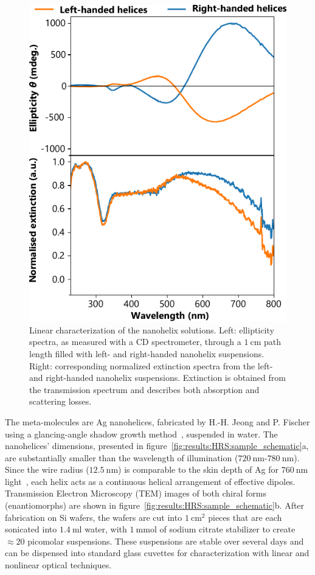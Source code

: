 \begin{figure}[htb!]	
    \centering	
    \includegraphics[scale=1]{./figures/results/HRS/linear_data.pdf}
    \caption{\label{fig:results:HRS:linear_data}
    Linear characterization of the nanohelix solutions. Left: ellipticity spectra, as measured with a CD spectrometer, through a $\SI{1}{\centi\m}$ path length filled with left- and right-handed nanohelix suspensions. Right: corresponding normalized extinction spectra from the left- and right-handed nanohelix suspensions. Extinction is obtained from the transmission spectrum and describes both absorption and scattering losses.}	
\end{figure}

The meta-molecules are Ag nanohelices, fabricated by H.-H. Jeong and P. Fischer using a glancing-angle shadow growth method~\cite{Gibbs2014}, suspended in water. The nanohelices' dimensions, presented in figure~\ref{fig:results:HRS:sample_schematic}a, are substantially smaller than the wavelength of illumination ($\SI{720}{\nano\m}$-$\SI{780}{\nano\m}$). Since the wire radius ($\SI{12.5}{\nano\m}$) is comparable to the skin depth of Ag for $\SI{760}{\nano\m}$ light~\cite{Johnson1972}, each helix acts as a continuous helical arrangement of effective dipoles. Transmission Electron Microscopy (TEM) images of both chiral forms (enantiomorphs) are shown in figure~\ref{fig:results:HRS:sample_schematic}b. 
After fabrication on Si wafers, the wafers are cut into $\SI{1}{\centi\meter\squared}$ pieces that are each sonicated into $\SI{1.4}{\milli\litre}$ water, with $\SI{1}{\milli\mole}$ of sodium citrate stabilizer to create $\approx 20$ picomolar suspensions. These suspensions are stable over several days and can be dispensed into standard glass cuvettes for characterization with linear and nonlinear optical techniques.  

